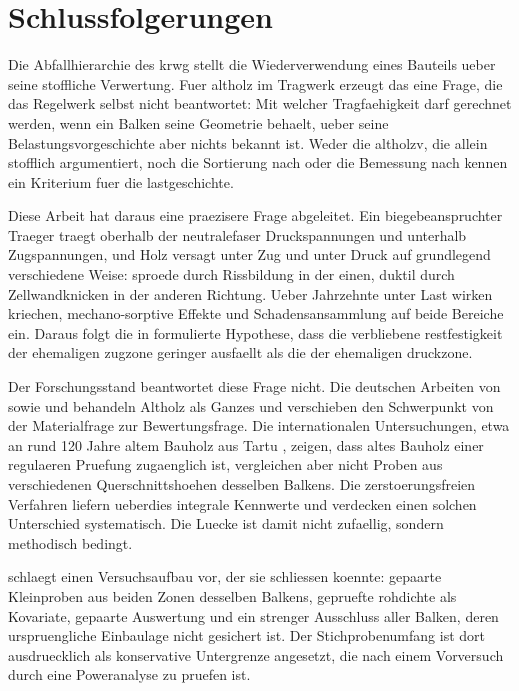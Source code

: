 \chapter{Schlussfolgerungen}
\label{ch:conclusion}

Die Abfallhierarchie des \acrshort{krwg} stellt die Wiederverwendung eines
Bauteils ueber seine stoffliche Verwertung. Fuer \gls{altholz} im Tragwerk
erzeugt das eine Frage, die das Regelwerk selbst nicht beantwortet: Mit
welcher Tragfaehigkeit darf gerechnet werden, wenn ein Balken seine Geometrie
behaelt, ueber seine Belastungsvorgeschichte aber nichts bekannt ist. Weder
die \acrshort{altholzv}, die allein stofflich argumentiert, noch die
Sortierung nach \parencite{din4074} oder die Bemessung nach \parencite{ec5}
kennen ein Kriterium fuer die \gls{lastgeschichte}.

Diese Arbeit hat daraus eine praezisere Frage abgeleitet. Ein biegebeanspruchter
Traeger traegt oberhalb der \gls{neutralefaser} Druckspannungen und unterhalb
Zugspannungen, und Holz versagt unter Zug und unter Druck auf grundlegend
verschiedene Weise: sproede durch Rissbildung in der einen, duktil durch
Zellwandknicken in der anderen Richtung. Ueber Jahrzehnte unter Last wirken
\gls{kriechen}, mechano-sorptive Effekte und Schadensansammlung auf beide
Bereiche ein. Daraus folgt die in  formulierte Hypothese, dass
die verbliebene \gls{restfestigkeit} der ehemaligen \gls{zugzone} geringer
ausfaellt als die der ehemaligen \gls{druckzone}.

Der Forschungsstand beantwortet diese Frage nicht. Die deutschen Arbeiten von
\textcite{rug1989} sowie \textcite{ehlbeck1988} und \textcite{ehlbeck1990}
behandeln Altholz als Ganzes und verschieben den Schwerpunkt von der
Materialfrage zur Bewertungsfrage. Die internationalen Untersuchungen, etwa an
rund 120 Jahre altem Bauholz aus Tartu \parencite{tartu}, zeigen, dass altes
Bauholz einer regulaeren Pruefung zugaenglich ist, vergleichen aber nicht
Proben aus verschiedenen Querschnittshoehen desselben Balkens. Die
zerstoerungsfreien Verfahren liefern ueberdies integrale Kennwerte und
verdecken einen solchen Unterschied systematisch. Die Luecke ist damit nicht
zufaellig, sondern methodisch bedingt.

 schlaegt einen Versuchsaufbau vor, der sie schliessen
koennte: gepaarte Kleinproben aus beiden Zonen desselben Balkens, gepruefte
\gls{rohdichte} als Kovariate, gepaarte Auswertung und ein strenger Ausschluss
aller Balken, deren urspruengliche Einbaulage nicht gesichert ist. Der
Stichprobenumfang ist dort ausdruecklich als konservative Untergrenze
angesetzt, die nach einem Vorversuch durch eine Poweranalyse zu pruefen ist.

